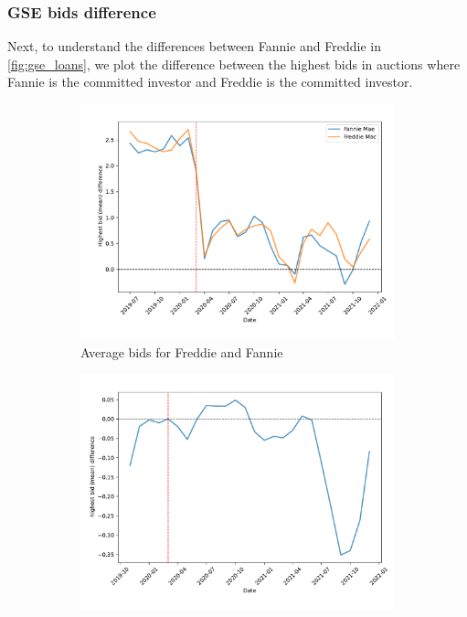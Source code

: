 \documentclass[11pt,a4paper]{article}
\begin{document}
\pagebreak
\subsubsection{GSE bids difference}

Next, to understand the differences between Fannie and Freddie in \ref{fig:gse_loans}, we plot the difference between the highest bids in auctions where Fannie is the committed investor and Freddie is the committed investor. 

\begin{figure}[h]
  \centering
  \begin{subfigure}[b]{0.49\textwidth}
      \includegraphics[width=0.998\textwidth]{../results/figures/price_freddie_mean_mat30_loan1_timeseries_nrmonthly_2.5_4_byGSE_c25.pdf}
      \caption{Average bids for Freddie and Fannie} %
     \end{subfigure}
     \begin{subfigure}[b]{0.49\textwidth}
      \includegraphics[width=0.998\textwidth]{../results/figures/price_diff_ma_mat30_loan1_timeseries_nrmonthly_2.5_4_diffFF_ma5_c25.pdf}

\end{subfigure}
\end{figure}
\end{document}
